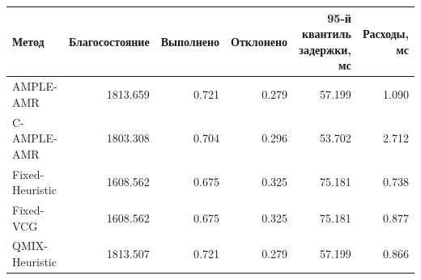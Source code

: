 \begin{tabular}{lrrrrr}
\toprule
 Метод & Благосостояние & Выполнено & Отклонено & 95-й квантиль задержки, мс & Расходы, мс \\
\midrule
 AMPLE-AMR & 1813.659 & 0.721 & 0.279 & 57.199 & 1.090 \\
 C-AMPLE-AMR & 1803.308 & 0.704 & 0.296 & 53.702 & 2.712 \\
 Fixed-Heuristic & 1608.562 & 0.675 & 0.325 & 75.181 & 0.738 \\
 Fixed-VCG & 1608.562 & 0.675 & 0.325 & 75.181 & 0.877 \\
 QMIX-Heuristic & 1813.507 & 0.721 & 0.279 & 57.199 & 0.866 \\
\bottomrule
\end{tabular}
